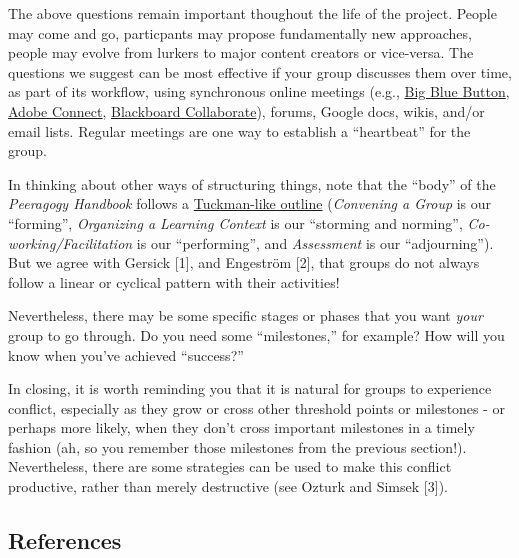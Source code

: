 The above questions remain important thoughout the life of the project.
People may come and go, particpants may propose fundamentally new
approaches, people may evolve from lurkers to major content creators or
vice-versa. The questions we suggest can be most effective if your group
discusses them over time, as part of its workflow, using synchronous
online meetings (e.g., \href{http://www.bigbluebutton.org/}{Big Blue
Button},
\href{http://success.adobe.com/en/na/sem/products/connect/1109_6011_connect_webinars.html?sdid=IEASO\&skwcid=TC/textbar\{\}22191/textbar\{\}adobe\%20connect/textbar\{\}/textbar\{\}S/textbar\{\}e/textbar\{\}5894715262}{Adobe
Connect},
\href{http://www.blackboard.com/platforms/collaborate/overview.aspx}{Blackboard
Collaborate}), forums, Google docs, wikis, and/or email lists. Regular
meetings are one way to establish a ``heartbeat'' for the group.

In thinking about other ways of structuring things, note that the
``body'' of the \emph{Peeragogy Handbook} follows a
\href{http://en.wikipedia.org/wiki/Forming-storming-norming-performing}{Tuckman-like
outline} (\emph{Convening a Group} is our ``forming'', \emph{Organizing
a Learning Context} is our ``storming and norming'',
\emph{Co-working/Facilitation} is our ``performing'', and
\emph{Assessment} is our ``adjourning''). But we agree with Gersick
{{[}1{]}}, and Engeström {{[}2{]}}, that groups do not always follow a
linear or cyclical pattern with their activities!

Nevertheless, there may be some specific stages or phases that you want
\emph{your} group to go through. Do you need some ``milestones,'' for
example? How will you know when you've achieved ``success?''

In closing, it is worth reminding you that it is natural for groups to
experience conflict, especially as they grow or cross other threshold
points or milestones - or perhaps more likely, when they don't cross
important milestones in a timely fashion (ah, so you remember those
milestones from the previous section!). Nevertheless, there are some
strategies can be used to make this conflict productive, rather than
merely destructive (see Ozturk and Simsek {{[}3{]}}).

\subsection{References}\label{convening-references}

